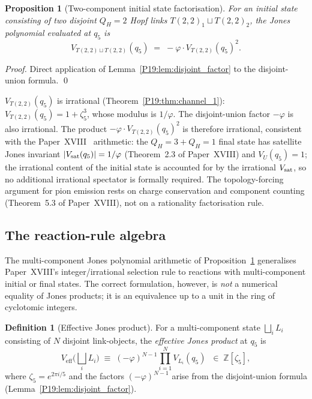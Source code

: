 \documentclass[11pt,a4paper]{article}
\newtheorem{proposition}[theorem]{Proposition}
\theoremstyle{definition}\newtheorem{definition}[theorem]{Definition}
\theoremstyle{remark}
\newcommand{\vp}{\varphi}
\newcommand{\QH}{Q_H}
\newcommand{\Jones}{V}
\begin{document}
\begin{proposition}[Two-component initial state factorisation]
\label{P19:prop:two_comp_initial}
For an initial state consisting of two disjoint $\QH=2$ Hopf
links $T(2,2)_1\sqcup T(2,2)_2$, the Jones polynomial evaluated at
$q_5$ is
\begin{equation}
  \Jones_{T(2,2)\sqcup T(2,2)}(q_5)
  \;=\; -\vp\cdot\Jones_{T(2,2)}(q_5)^2.
  \label{P19:eq:two_hopf_disjoint}
\end{equation}
\end{proposition}

\begin{proof}
Direct application of Lemma~\ref{P19:lem:disjoint_factor} to the
disjoint-union formula.
\qed
\end{proof}

$\Jones_{T(2,2)}(q_5)$ is irrational
(Theorem~\ref{P19:thm:channel_1}):
$\Jones_{T(2,2)}(q_5)=1+\zeta_5^3$, whose modulus is $1/\vp$.
The disjoint-union factor $-\vp$ is also irrational.  The
product $-\vp\cdot\Jones_{T(2,2)}(q_5)^2$ is therefore irrational,
consistent with the Paper~XVIII~\cite{Paper18} arithmetic: the
$\QH=3+\QH=1$ final state has satellite Jones invariant
$|\Jones_{\rm sat}(q_5)|=1/\vp$ (Theorem~2.3 of Paper~XVIII) %
and $\Jones_U(q_5)=1$; the irrational content of the initial
state is accounted for by the irrational $\Jones_{\rm sat}$, so
no additional irrational spectator is formally required.
The topology-forcing argument for pion emission rests on
charge conservation and component counting
(Theorem~5.3 of Paper~XVIII), %
not on a rationality factorisation rule.

\subsection{The reaction-rule algebra}

The multi-component Jones polynomial arithmetic of
Proposition~\ref{P19:prop:two_comp_initial} generalises Paper~XVIII's
integer/irrational selection rule to reactions with multi-component
initial or final states.  The correct formulation, however, is
\emph{not} a numerical equality of Jones products; it is an
equivalence up to a unit in the ring of cyclotomic integers.

\begin{definition}[Effective Jones product]
\label{P19:def:effective_jones}
For a multi-component state $\bigsqcup_i L_i$ consisting of $N$
disjoint link-objects, the \emph{effective Jones product} at $q_5$
is
\begin{equation}
  \Jones_{\mathrm{eff}}\bigl(\bigsqcup_i L_i\bigr)
  \;\equiv\;
  (-\vp)^{N-1}\prod_{i=1}^N \Jones_{L_i}(q_5)
  \;\;\in\; \mathbb{Z}[\zeta_5],
  \label{P19:eq:eff_jones_def}
\end{equation}
where $\zeta_5=e^{2\pi i/5}$ and the factors $(-\vp)^{N-1}$ arise
from the disjoint-union formula
(Lemma~\ref{P19:lem:disjoint_factor}).
\end{definition}
\end{document}
